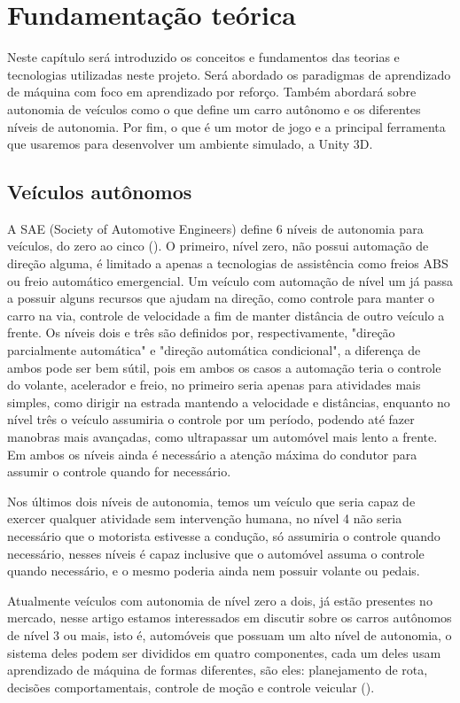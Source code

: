 \chapter{Fundamentação teórica}
Neste capítulo será introduzido os conceitos e fundamentos das teorias e tecnologias utilizadas neste projeto. Será abordado os paradigmas de aprendizado de máquina com foco em aprendizado por reforço. Também abordará sobre autonomia de veículos como o que define um carro autônomo e os diferentes níveis de autonomia. Por fim, o que é um motor de jogo e a principal ferramenta que usaremos para desenvolver um ambiente simulado, a Unity 3D.

\section{Veículos autônomos}
A SAE (Society of Automotive Engineers) define 6 níveis de autonomia para veículos, do zero ao cinco (). O primeiro, nível zero, não possui automação de direção alguma, é limitado a apenas a tecnologias de assistência como freios ABS ou freio automático emergencial. Um veículo com automação de nível um já passa a possuir alguns recursos que ajudam na direção, como controle para manter o carro na via, controle de velocidade a fim de manter distância de outro veículo a frente. Os níveis dois e três são definidos por, respectivamente, "direção parcialmente automática" e "direção automática condicional", a diferença de ambos pode ser bem sútil, pois em ambos os casos a automação teria o controle do volante, acelerador e freio, no primeiro seria apenas para atividades mais simples, como dirigir na estrada mantendo a velocidade e distâncias, enquanto no nível três o veículo assumiria o controle por um período, podendo até fazer manobras mais avançadas, como ultrapassar um automóvel mais lento a frente. Em ambos os níveis ainda é necessário a atenção máxima do condutor para assumir o controle quando for necessário.

Nos últimos dois níveis de autonomia, temos um veículo que seria capaz de exercer qualquer atividade sem intervenção humana, no nível 4 não seria necessário que o motorista estivesse a condução, só assumiria o controle quando necessário, nesses níveis é capaz inclusive que o automóvel assuma o controle quando necessário, e o mesmo poderia ainda nem possuir volante ou pedais.

Atualmente veículos com autonomia de nível zero a dois, já estão presentes no mercado, nesse artigo estamos interessados em discutir sobre os carros autônomos de nível 3 ou mais, isto é, automóveis que possuam um alto nível de autonomia, o sistema deles podem ser divididos em quatro componentes, cada um deles usam aprendizado de máquina de formas diferentes, são eles: planejamento de rota, decisões comportamentais, controle de moção e controle veicular (). 

